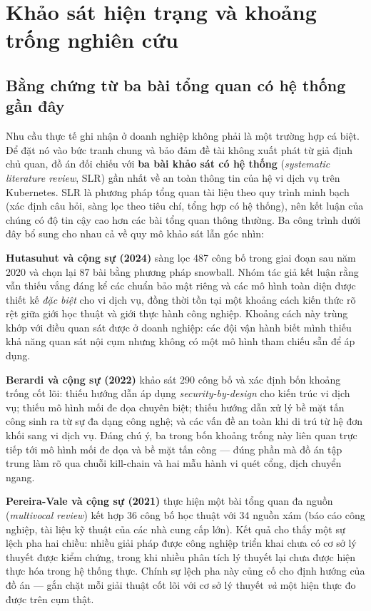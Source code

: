 \section{Khảo sát hiện trạng và khoảng trống nghiên cứu}

\subsection{Bằng chứng từ ba bài tổng quan có hệ thống gần đây}

Nhu cầu thực tế ghi nhận ở doanh nghiệp không phải là một trường hợp cá biệt. Để đặt nó
vào bức tranh chung và bảo đảm đề tài không xuất phát từ giả định chủ quan, đồ án đối
chiếu với \textbf{ba bài khảo sát có hệ thống} (\textit{systematic literature review}, SLR)
gần nhất về an toàn thông tin của hệ vi dịch vụ trên Kubernetes. SLR là phương pháp tổng
quan tài liệu theo quy trình minh bạch (xác định câu hỏi, sàng lọc theo tiêu chí, tổng hợp
có hệ thống), nên kết luận của chúng có độ tin cậy cao hơn các bài tổng quan thông thường.
Ba công trình dưới đây bổ sung cho nhau cả về quy mô khảo sát lẫn góc nhìn:

\textbf{Hutasuhut và cộng sự (2024)} \cite{hutasuhut2024gap} sàng lọc 487 công bố trong
giai đoạn sau năm 2020 và chọn lại 87 bài bằng phương pháp snowball. Nhóm tác giả kết luận
rằng vẫn thiếu vắng đáng kể các chuẩn bảo mật riêng và các mô hình toàn diện được thiết kế
\emph{đặc biệt} cho vi dịch vụ, đồng thời tồn tại một khoảng cách kiến thức rõ rệt giữa giới
học thuật và giới thực hành công nghiệp. Khoảng cách này trùng khớp với điều quan sát được ở
doanh nghiệp: các đội vận hành biết mình thiếu khả năng quan sát nội cụm nhưng không có một
mô hình tham chiếu sẵn để áp dụng.

\textbf{Berardi và cộng sự (2022)} \cite{berardi2022microservice} khảo sát 290 công bố và
xác định bốn khoảng trống cốt lõi: thiếu hướng dẫn áp dụng \textit{security-by-design} cho
kiến trúc vi dịch vụ; thiếu mô hình mối đe dọa chuyên biệt; thiếu hướng dẫn xử lý bề mặt
tấn công sinh ra từ sự đa dạng công nghệ; và các vấn đề an toàn khi di trú từ hệ đơn khối
sang vi dịch vụ. Đáng chú ý, ba trong bốn khoảng trống này liên quan trực tiếp tới mô hình
mối đe dọa và bề mặt tấn công --- đúng phần mà đồ án tập trung làm rõ qua chuỗi kill-chain
và hai mẫu hành vi quét cổng, dịch chuyển ngang.

\textbf{Pereira-Vale và cộng sự (2021)} \cite{pereiravale2021security} thực hiện một bài
tổng quan đa nguồn (\textit{multivocal review}) kết hợp 36 công bố học thuật với 34 nguồn
xám (báo cáo công nghiệp, tài liệu kỹ thuật của các nhà cung cấp lớn). Kết quả cho thấy
một sự lệch pha hai chiều: nhiều giải pháp được công nghiệp triển khai chưa có cơ sở lý
thuyết được kiểm chứng, trong khi nhiều phân tích lý thuyết lại chưa được hiện thực hóa
trong hệ thống thực. Chính sự lệch pha này củng cố cho định hướng của đồ án --- gắn chặt
mỗi giải thuật cốt lõi với cơ sở lý thuyết \emph{và} một hiện thực đo được trên cụm thật.

